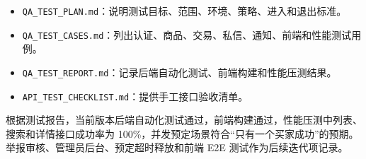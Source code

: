 ﻿\documentclass[UTF8,a4paper,12pt]{ctexart}
\begin{document}
\begin{itemize}
  \item \texttt{QA\_TEST\_PLAN.md}：说明测试目标、范围、环境、策略、进入和退出标准。
  \item \texttt{QA\_TEST\_CASES.md}：列出认证、商品、交易、私信、通知、前端和性能测试用例。
  \item \texttt{QA\_TEST\_REPORT.md}：记录后端自动化测试、前端构建和性能压测结果。
  \item \texttt{API\_TEST\_CHECKLIST.md}：提供手工接口验收清单。
\end{itemize}

根据测试报告，当前版本后端自动化测试通过，前端构建通过，性能压测中列表、搜索和详情接口成功率为 100\%，并发预定场景符合“只有一个买家成功”的预期。举报审核、管理员后台、预定超时释放和前端 E2E 测试作为后续迭代项记录。
\end{document}
